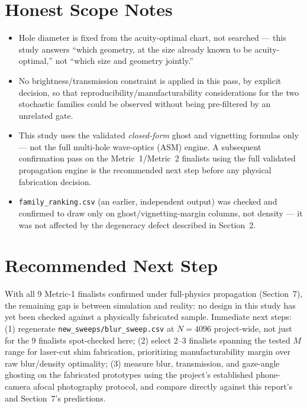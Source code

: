 \documentclass[11pt]{article}
\begin{document}
\section{Honest Scope Notes}
\begin{itemize}
  \item Hole diameter is fixed from the acuity-optimal chart, not searched ---
  this study answers ``which geometry, at the size already known to be
  acuity-optimal,'' not ``which size and geometry jointly.''
  \item No brightness/transmission constraint is applied in this pass, by
  explicit decision, so that reproducibility/manufacturability
  considerations for the two stochastic families could be observed
  without being pre-filtered by an unrelated gate.
  \item This study uses the validated \emph{closed-form} ghost and
  vignetting formulas only --- not the full multi-hole wave-optics (ASM)
  engine. A subsequent confirmation pass on the Metric~1/Metric~2 finalists
  using the full validated propagation engine is the recommended next step
  before any physical fabrication decision.
  \item \texttt{family\_ranking.csv} (an earlier, independent output) was
  checked and confirmed to draw only on ghost/vignetting-margin columns, not
  density --- it was not affected by the degeneracy defect described in
  Section~2.
\end{itemize}



\section{Recommended Next Step}
With all 9 Metric-1 finalists confirmed under full-physics propagation
(Section~7), the remaining gap is between simulation and reality: no design
in this study has yet been checked against a physically fabricated sample.
Immediate next steps: (1) regenerate \texttt{new\_sweeps/blur\_sweep.csv} at
$N{=}4096$ project-wide, not just for the 9 finalists spot-checked here; (2)
select 2--3 finalists spanning the tested $M$ range for laser-cut shim
fabrication, prioritizing manufacturability margin over raw blur/density
optimality; (3) measure blur, transmission, and gaze-angle ghosting on the
fabricated prototypes using the project's established phone-camera afocal
photography protocol, and compare directly against this report's and
Section~7's predictions.
\end{document}
